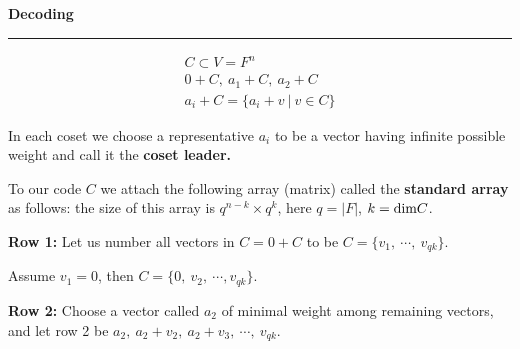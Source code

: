 \documentclass{article}
\newcommand{\header}[1]{
	\begin{Large}
	\noindent\textbf{#1}
	\hrule
	\vspace{16pt}
	\normalsize
	\end{Large}
}
\newcommand{\eqs}[1]{
	\begin{gather*}
		#1
	\end{gather*}
}
\begin{document}
\header{Decoding}

\eqs{
	C \subset V = F^n \\
	0+C,\ a_1+C,\ a_2+C  \\
	a_i + C = \{a_i + v\ |\ v \in C\}
}

In each coset we choose a representative $a_i$ to be a vector having infinite
possible weight and call it the \textbf{coset leader.}

To our code $C$ we attach the following array (matrix) called the
\textbf{standard array} as follows: the size of this array is
$q^{n-k} \times q^k$, here $q = |F|$, $k = \textnormal{dim} C$.

\textbf{Row 1:} Let us number all vectors in $C = 0+C$ to be $C = \{v_1,\ \cdots,\ v_{qk}\}$.

Assume $v_1 = 0$, then $C = \{0,\ v_2,\ \cdots, v_{qk}\}$.

\textbf{Row 2:} Choose a vector called $a_2$ of minimal weight among remaining
vectors, and let row 2 be $a_2,\ a_2+v_2,\ a_2+v_3,\ \cdots,\ v_{qk}$.
\end{document}
